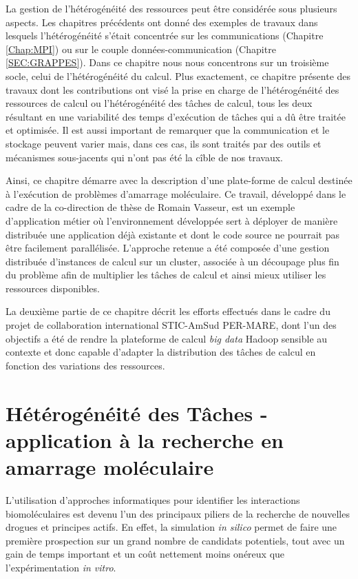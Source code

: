 \begin{resume}
La gestion de l'hétérogénéité des ressources peut être considérée sous plusieurs aspects. Les chapitres précédents ont donné des exemples de travaux dans lesquels l'hétérogénéité s'était concentrée sur les communications (Chapitre \ref{Chap:MPI}) ou sur le couple données-communication (Chapitre \ref{SEC:GRAPPES}). Dans ce chapitre nous nous concentrons sur un troisième socle, celui de l'hétérogénéité du calcul. Plus exactement, ce chapitre présente des travaux dont les contributions ont visé la prise en charge de l'hétérogénéité des ressources de calcul ou l'hétérogénéité des tâches de calcul, tous les deux résultant en une variabilité des temps d'exécution de tâches qui a dû être traitée et optimisée. Il est aussi important de remarquer que la communication et le stockage peuvent varier mais, dans ces cas, ils sont traités par des outils et mécanismes sous-jacents qui n'ont pas été la cîble de nos travaux.

Ainsi, ce chapitre démarre avec la description d'une plate-forme de calcul destinée à l'exécution de problèmes d'amarrage moléculaire. Ce travail, développé dans le cadre de la co-direction de thèse de Romain Vasseur, est un exemple d'application métier où l'environnement développée sert à déployer de manière distribuée une application déjà existante et dont le code source ne pourrait pas être facilement parallélisée. L'approche retenue a été composée d'une gestion distribuée d'instances de calcul sur un cluster, associée à un découpage plus fin du problème afin de multiplier les tâches de calcul et ainsi mieux utiliser les ressources disponibles.

La deuxième partie de ce chapitre décrit les efforts effectués dans le cadre du projet de collaboration international STIC-AmSud PER-MARE, dont l'un des objectifs a été de rendre la plateforme de calcul \textit{big data} Hadoop sensible au contexte et donc capable d'adapter la distribution des tâches de calcul en fonction des variations des ressources.

\end{resume}

\section{Hétérogénéité des Tâches  - application à la recherche en amarrage moléculaire} \label{sec:Vasseur}

L'utilisation d'approches informatiques pour identifier les interactions biomoléculaires est devenu l'un des principaux piliers de la recherche de nouvelles drogues et principes actifs. En effet, la simulation \emph{in silico} permet de faire une première prospection sur un grand nombre de candidats potentiels, tout avec un gain de temps important et un coût nettement moins onéreux que l'expérimentation \emph{in vitro}. 

